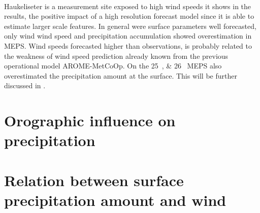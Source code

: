 \\
Haukeliseter is a measurement site exposed to high wind speeds \citep{wolff_measurements_2013,wolff_derivation_2015} it shows in the results, the positive impact of a high resolution forecast model since it is able to estimate larger scale features. In general were surface parameters well forecasted, only wind wind speed and precipitation accumulation showed overestimation in MEPS. Wind speeds forecasted higher than observations, is probably related to the weakness of wind speed prediction already known from the previous operational model AROME-MetCoOp. On the \SIlist{25;26}{\dec} MEPS also overestimated the precipitation amount at the surface. This will be further discussed in .

\section{Orographic influence on precipitation}

\section{Relation between surface precipitation amount and wind}\label{sec:sfc_acc}





